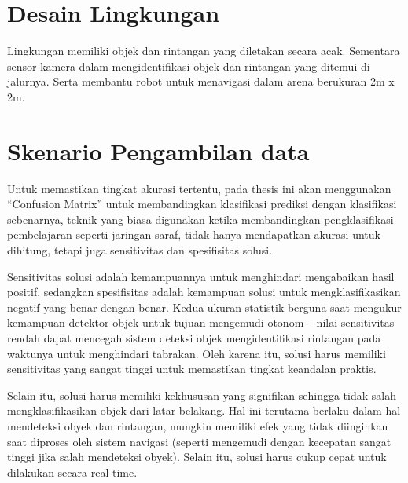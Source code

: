 \section{Desain Lingkungan}
Lingkungan memiliki objek dan rintangan yang diletakan secara acak.  Sementara sensor kamera dalam mengidentifikasi objek dan rintangan yang ditemui di jalurnya. Serta membantu robot untuk menavigasi dalam arena berukuran 2m x 2m.






\section{Skenario Pengambilan data}



Untuk memastikan tingkat akurasi tertentu, pada thesis ini akan menggunakan “Confusion Matrix” untuk membandingkan klasifikasi prediksi dengan klasifikasi sebenarnya, teknik yang biasa digunakan ketika membandingkan pengklasifikasi pembelajaran seperti jaringan saraf, tidak hanya mendapatkan akurasi untuk dihitung, tetapi juga sensitivitas dan spesifisitas solusi. 

Sensitivitas solusi adalah kemampuannya untuk menghindari mengabaikan hasil positif, sedangkan spesifisitas adalah kemampuan solusi untuk mengklasifikasikan negatif yang benar dengan benar. Kedua ukuran statistik berguna saat mengukur kemampuan detektor objek untuk tujuan mengemudi otonom – nilai sensitivitas rendah dapat mencegah sistem deteksi objek mengidentifikasi rintangan pada waktunya untuk menghindari tabrakan. Oleh karena itu, solusi harus memiliki sensitivitas yang sangat tinggi untuk memastikan tingkat keandalan praktis.

Selain itu, solusi harus memiliki kekhususan yang signifikan sehingga tidak salah mengklasifikasikan objek dari latar belakang. Hal ini terutama berlaku dalam hal mendeteksi obyek dan rintangan,  mungkin memiliki efek yang tidak diinginkan saat diproses oleh sistem navigasi (seperti mengemudi dengan kecepatan sangat tinggi jika salah mendeteksi obyek).
Selain itu, solusi harus cukup cepat untuk dilakukan secara real time. 

